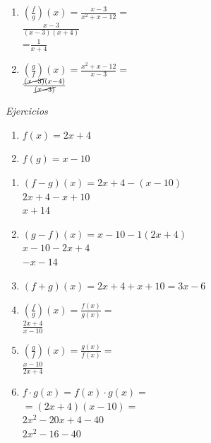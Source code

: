 \documentclass[english,10pt,a4paper]{article}
\begin{document}
{\begin{enumerate}
{}
\item {$(\frac{f}{g})(x)=\frac{x-3}{x^{2}+x-12}=$\\
	$\frac{x-3}{(x-3)(x+4)}$\\
	=$\frac{1}{x+4}$\\
	
	
	
}
\item {$(\frac{g}{f})(x)=\frac{x^{2}+x-12}{x-3}=$\\
	$\frac{\cancel{(x-3)}(x-4)}{\cancel{(x-3)}}$
	



}
	
\end{enumerate}
\newpage
{\centering\emph{Ejercicios}\\
}

\begin{enumerate}
	
	
\item {\center $f(x)=2x+4$\\
	}
	\item {\center$f(g)=x-10$\\
	}

\end{enumerate}

\begin{enumerate}
\item{$(f-g)(x)=2x+4-(x-10)$\\
	$2x+4-x+10$\\
	$x+14$
	
}
\item {$(g-f)(x)=x-10-1(2x+4)$\\
	$x-10-2x+4$\\
	$-x-14$\\
	
	
	
}
\item {$(f+g)(x)=2x+4+x+10=3x-6$\\
}
\item {$(\frac{f}{g})(x)=\frac{f(x)}{g(x)}=$\\
	$\frac{2x+4}{x-10}$\\

}
\item {$(\frac{g}{f})(x)=\frac{g(x)}{f(x)}=$\\
	$\frac{x-10}{2x+4}$\\
}

\item {$f\cdot g (x)=f(x)\cdot g(x)=$\\
		$=(2x+4)(x-10)=$\\
		$2x^{2}-20x+4-40$\\
		$2x^{2}-16-40$
		




}
\end{enumerate}}
\end{document}
